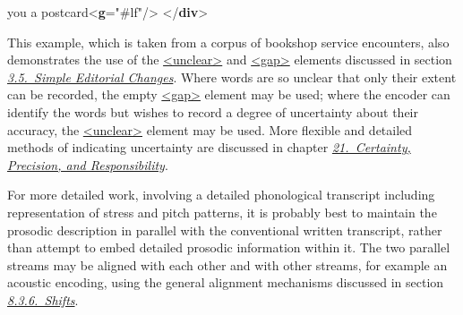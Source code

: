 \begin{shaded}
\hspace*{1em}\hspace*{1em}\hspace*{1em}\hspace*{1em} you a postcard{<\textbf{g}\hspace*{1em}{ref}="{\#lf}"/>}\mbox{}\newline 
\hspace*{1em}\mbox{}\newline 
{}\mbox{}\newline 
{</\textbf{div}>}\end{shaded}\egroup\par \noindent  \par
This example, which is taken from a corpus of bookshop service encounters,  also demonstrates the use of the \hyperref[TEI.unclear]{<unclear>} and \hyperref[TEI.gap]{<gap>} elements discussed in section \textit{\hyperref[COED]{3.5.\ Simple Editorial Changes}}. Where words are so unclear that only their extent can be recorded, the empty \hyperref[TEI.gap]{<gap>} element may be used; where the encoder can identify the words but wishes to record a degree of uncertainty about their accuracy, the \hyperref[TEI.unclear]{<unclear>} element may be used. More flexible and detailed methods of indicating uncertainty are discussed in chapter \textit{\hyperref[CE]{21.\ Certainty, Precision, and Responsibility}}.\par
For more detailed work, involving a detailed phonological transcript including representation of stress and pitch patterns, it is probably best to maintain the prosodic description in parallel with the conventional written transcript, rather than attempt to embed detailed prosodic information within it. The two parallel streams may be aligned with each other and with other streams, for example an acoustic encoding, using the general alignment mechanisms discussed in section \textit{\hyperref[TSSASH]{8.3.6.\ Shifts}}.

